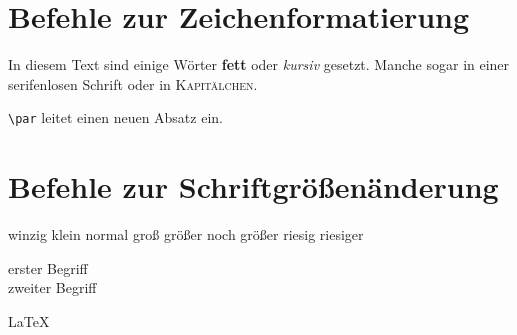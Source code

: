 \documentclass{scrartcl}
\begin{document}
\section{Befehle zur Zeichenformatierung}
In diesem Text sind einige Wörter \textsf{\textbf{fett}} oder \textit{kursiv} gesetzt. Manche sogar in einer \textsf{serifenlosen Schrift} oder in \textsc{Kapitälchen}. \par \texttt{\textbackslash par} leitet einen neuen Absatz ein.

\section{Befehle zur Schriftgrößenänderung}

\tiny winzig \small klein \normalsize normal \large groß \Large größer \LARGE noch größer \huge riesig \Huge  riesiger
\normalsize

\begin{description}
\item[erster Begriff] \blindtext
\item[zweiter Begriff] \blindtext
\end{description}

\LaTeX
\end{document}
